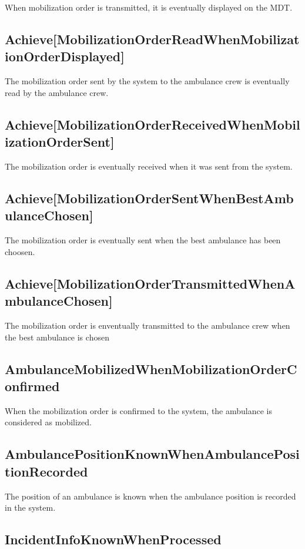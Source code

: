 When mobilization order is transmitted, it is eventually displayed on the MDT.
 

\subsection{Achieve[MobilizationOrderReadWhenMobilizationOrderDisplayed]}

The mobilization order sent by the system to the ambulance crew is eventually read by the ambulance crew.


\subsection{Achieve[MobilizationOrderReceivedWhenMobilizationOrderSent]}

The mobilization order is eventually received when it was sent from the system.


\subsection{Achieve[MobilizationOrderSentWhenBestAmbulanceChosen]}

The mobilization order is eventually sent when the best ambulance has been choosen.


\subsection{Achieve[MobilizationOrderTransmittedWhenAmbulanceChosen]}

The mobilization order is enventually transmitted to the ambulance crew when the best ambulance is chosen


\subsection{AmbulanceMobilizedWhenMobilizationOrderConfirmed}

When the mobilization order is confirmed to the system, the ambulance is considered as mobilized. 


\subsection{AmbulancePositionKnownWhenAmbulancePositionRecorded}

The position of an ambulance is known when the ambulance position is recorded in the system.


\subsection{IncidentInfoKnownWhenProcessed}

